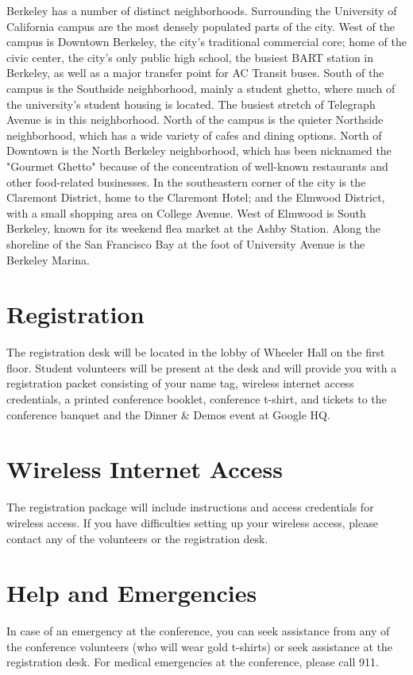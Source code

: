 Berkeley has a number of distinct neighborhoods. Surrounding the University of California campus are the most densely populated parts of the city. West of the campus is Downtown Berkeley, the city's traditional commercial core; home of the civic center, the city's only public high school, the busiest BART station in Berkeley, as well as a major transfer point for AC Transit buses. South of the campus is the Southside neighborhood, mainly a student ghetto, where much of the university's student housing is located. The busiest stretch of Telegraph Avenue is in this neighborhood. North of the campus is the quieter Northside neighborhood, which has a wide variety of cafes and dining options. North of Downtown is the North Berkeley neighborhood, which has been nicknamed the "Gourmet Ghetto" because of the concentration of well-known restaurants and other food-related businesses. In the southeastern corner of the city is the Claremont District, home to the Claremont Hotel; and the Elmwood District, with a small shopping area on College Avenue. West of Elmwood is South Berkeley, known for its weekend flea market at the Ashby Station. Along the shoreline of the San Francisco Bay at the foot of University Avenue is the Berkeley Marina. 

\vspace{3mm}

\section*{Registration}

The registration desk will be located in the lobby of Wheeler Hall on the first floor. Student volunteers will be present at the desk and will provide you with a registration packet consisting of your name tag, wireless internet access credentials, a printed conference booklet, conference t-shirt, and tickets to the conference banquet and the Dinner \& Demos event at Google HQ.

\vspace{3mm}
\section*{Wireless Internet Access}
The registration package will include instructions and access credentials for wireless access. If you have difficulties setting up your wireless access, please contact any of the volunteers or the registration desk.

\vspace{3mm}
\section*{Help and Emergencies}
In case of an emergency at the conference, you can seek assistance from any of the conference volunteers (who will wear gold t-shirts) or seek assistance at the registration desk. For medical emergencies at the conference, please call 911.

